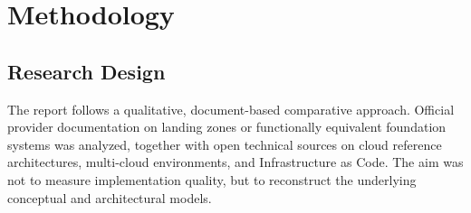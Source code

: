 \section{Methodology}
\label{sec:methodik}




\subsection{Research Design}

The report follows a qualitative, document-based comparative approach. Official provider documentation on landing zones or functionally equivalent foundation systems was analyzed, together with open technical sources on cloud reference architectures, multi-cloud environments, and Infrastructure as Code. The aim was not to measure implementation quality, but to reconstruct the underlying conceptual and architectural models.

